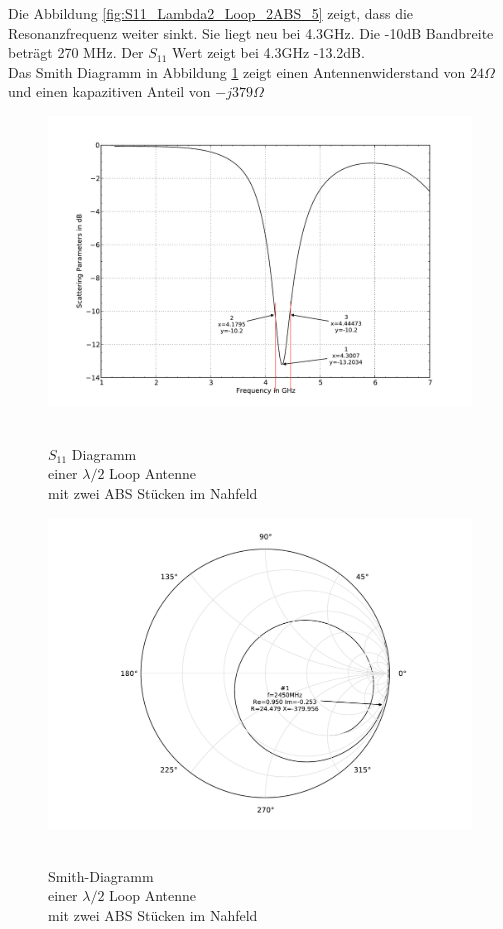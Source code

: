 Die Abbildung \ref{fig:S11_Lambda2_Loop_2ABS_5} zeigt, dass die Resonanzfrequenz weiter sinkt. Sie liegt neu bei 4.3GHz. Die -10dB Bandbreite beträgt 270 MHz. Der $S_{11}$ Wert zeigt bei 4.3GHz -13.2dB.\\
Das Smith Diagramm in Abbildung \ref{fig:Smith_Lambda2_Loop_2ABS_6} zeigt einen Antennenwiderstand von $24\Omega$ und einen kapazitiven Anteil von $-j379\Omega$\\
\begin{figure}[!ht]
	\begin{center}
 	\includegraphics[width=\linewidth]{content/bilder/Evaluation/Loop/L2/2ABS/S11_Loop_Lambda2_mit2ABS.pdf}
  	\caption{\\$S_{11}$ Diagramm \\einer $\lambda/2$ Loop Antenne \\mit zwei ABS Stücken im Nahfeld}				\label{fig:S11_Lambda2_Loop_2ABS_5}
\endminipage%
 	\includegraphics[width=\linewidth]{content/bilder/Evaluation/Loop/L2/2ABS/Smith_Loop_Lambda2_mit2ABS.pdf}
  	\caption{\\Smith-Diagramm \\einer $\lambda/2$ Loop Antenne \\ mit zwei ABS Stücken im Nahfeld}		\label{fig:Smith_Lambda2_Loop_2ABS_6}
	\endminipage
	\end{center}
\end{figure}
